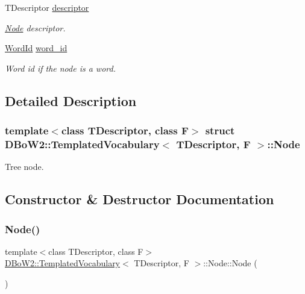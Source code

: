 \begin{DoxyCompactItemize}
\mbox{\label{structDBoW2_1_1TemplatedVocabulary_1_1Node_ab785e994eeae8e6c1d67ee45ad4c8450}} 
T\+Descriptor \hyperlink{structDBoW2_1_1TemplatedVocabulary_1_1Node_ab785e994eeae8e6c1d67ee45ad4c8450}{descriptor}
\begin{DoxyCompactList}\small\item\em \hyperlink{structDBoW2_1_1TemplatedVocabulary_1_1Node}{Node} descriptor. \end{DoxyCompactList}\item 
\mbox{\label{structDBoW2_1_1TemplatedVocabulary_1_1Node_aa56418d848932be4583fac6b3021c708}} 
\hyperlink{namespaceDBoW2_ab1a0d3283b2d4690a383372ed20bfeb5}{Word\+Id} \hyperlink{structDBoW2_1_1TemplatedVocabulary_1_1Node_aa56418d848932be4583fac6b3021c708}{word\+\_\+id}
\begin{DoxyCompactList}\small\item\em Word id if the node is a word. \end{DoxyCompactList}\end{DoxyCompactItemize}


\subsection{Detailed Description}
\subsubsection*{template$<$class T\+Descriptor, class F$>$\newline
struct D\+Bo\+W2\+::\+Templated\+Vocabulary$<$ T\+Descriptor, F $>$\+::\+Node}

Tree node. 

\subsection{Constructor \& Destructor Documentation}
\mbox{\label{structDBoW2_1_1TemplatedVocabulary_1_1Node_a1339ee00108c4c652cd1ca55a37c3fd3}} 
\subsubsection{\texorpdfstring{Node()}{Node()}\hspace{0.1cm}{\footnotesize\ttfamily [1/2]}}
{\footnotesize\ttfamily template$<$class T\+Descriptor, class F$>$ \\
\hyperlink{classDBoW2_1_1TemplatedVocabulary}{D\+Bo\+W2\+::\+Templated\+Vocabulary}$<$ T\+Descriptor, F $>$\+::Node\+::\+Node (\begin{DoxyParamCaption}{ }\end{DoxyParamCaption})\hspace{0.3cm}{\ttfamily [inline]}}

